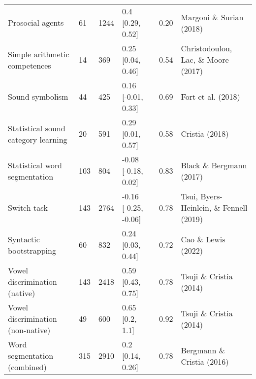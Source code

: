 \documentclass[
  man]{apa6}
\begin{document}
\begin{table*}[hbt]
\begin{landscape}
\begin{center}
\begin{threeparttable}
\begin{tabular}{llllll}
Prosocial agents & 61 & 1244 & 0.4 [0.29, 0.52] & 0.20 & Margoni \& Surian (2018)\\
Simple arithmetic competences & 14 & 369 & 0.25 [0.04, 0.46] & 0.54 & Christodoulou, Lac, \& Moore (2017)\\
Sound symbolism & 44 & 425 & 0.16 [-0.01, 0.33] & 0.69 & Fort et al. (2018)\\
Statistical sound category learning & 20 & 591 & 0.29 [0.01, 0.57] & 0.58 & Cristia (2018)\\
Statistical word segmentation & 103 & 804 & -0.08 [-0.18, 0.02] & 0.83 & Black \& Bergmann (2017)\\
Switch task & 143 & 2764 & -0.16 [-0.25, -0.06] & 0.78 & Tsui, Byers-Heinlein, \& Fennell (2019)\\
Syntactic bootstrapping & 60 & 832 & 0.24 [0.03, 0.44] & 0.72 & Cao \& Lewis (2022)\\
Vowel discrimination (native) & 143 & 2418 & 0.59 [0.43, 0.75] & 0.78 & Tsuji \& Cristia (2014)\\
Vowel discrimination (non-native) & 49 & 600 & 0.65 [0.2, 1.1] & 0.92 & Tsuji \& Cristia (2014)\\
Word segmentation (combined) & 315 & 2910 & 0.2 [0.14, 0.26] & 0.78 & Bergmann \& Cristia (2016)\\
\bottomrule
\end{tabular}

\end{threeparttable}
\end{center}
\end{landscape}


\end{table*}
\efloatseparator
\end{document}
